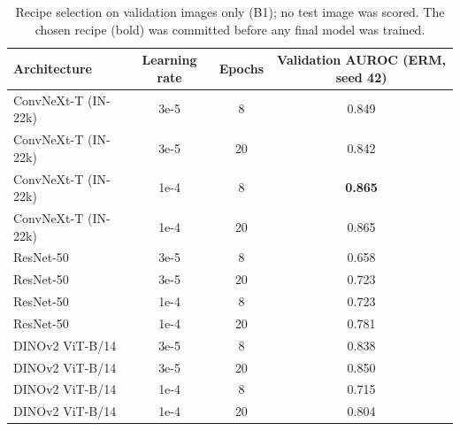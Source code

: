 \begin{table}[H]\centering\scriptsize
\caption{Recipe selection on validation images only (B1); no test image was scored. The chosen recipe (bold) was committed before any final model was trained.}\label{tab:recipe}
\begin{tabular}{lccc}\toprule
Architecture & Learning rate & Epochs & Validation AUROC (ERM, seed 42) \\\midrule
ConvNeXt-T (IN-22k) & 3e-5 & 8 & 0.849 \\
ConvNeXt-T (IN-22k) & 3e-5 & 20 & 0.842 \\
ConvNeXt-T (IN-22k) & 1e-4 & 8 & \textbf{0.865} \\
ConvNeXt-T (IN-22k) & 1e-4 & 20 & 0.865 \\
ResNet-50 & 3e-5 & 8 & 0.658 \\
ResNet-50 & 3e-5 & 20 & 0.723 \\
ResNet-50 & 1e-4 & 8 & 0.723 \\
ResNet-50 & 1e-4 & 20 & 0.781 \\
DINOv2 ViT-B/14 & 3e-5 & 8 & 0.838 \\
DINOv2 ViT-B/14 & 3e-5 & 20 & 0.850 \\
DINOv2 ViT-B/14 & 1e-4 & 8 & 0.715 \\
DINOv2 ViT-B/14 & 1e-4 & 20 & 0.804 \\
\bottomrule\end{tabular}
\end{table}
